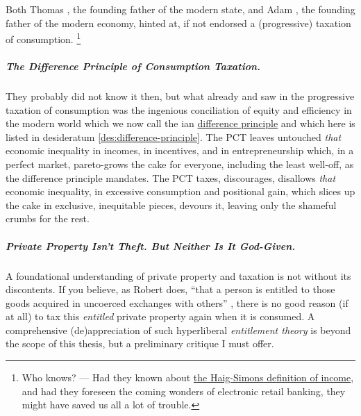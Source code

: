 Both Thomas \citeauthor{Hobbes-1651-aa}, the founding father of the modern state, and Adam \citeauthor{Smith-1776-lq}, the founding father of the modern economy, hinted at, if not endorsed a (progressive) taxation of consumption.
\footnote{
	Who knows?
	--- Had they known about \hyperref[eq:HaigSimonsPCT]{the Haig-Simons definition of income}, and had they foreseen the coming wonders of electronic retail banking, they might have saved us all a lot of trouble.
}

\subparagraph{The Difference Principle of Consumption Taxation.}
They probably did not know it then, but what already \citeauthor{Hobbes-1651-aa} and \citeauthor{Smith-1776-lq} saw in the progressive taxation of consumption was the ingenious conciliation of equity and efficiency in the modern world which we now call the \citeauthor{Rawls-1971}ian \hyperref[des:difference-principle]{difference principle} and which here is listed in desideratum \ref{des:difference-principle}.
The PCT leaves untouched \emph{that} economic inequality in incomes, in incentives, and in entrepreneurship which, in a perfect market, pareto-grows the cake for everyone, including the least well-off, as the difference principle mandates.
The PCT taxes, discourages, disallows \emph{that} economic inequality, in excessive consumption and positional gain, which slices up the cake in exclusive, inequitable pieces, devours it, leaving only the shameful crumbs for the rest.

\subparagraph{Private Property Isn't Theft. But Neither Is It God-Given.}
	\label{sec:AntiEntitlement}
A foundational understanding of private property and taxation is not without its discontents.
If you believe, as Robert \citeauthor{Nozick1974} does, ``that a person is entitled to those goods acquired in uncoerced exchanges with others'' \citeyearpar[149]{Nozick1974}, there is no good reason (if at all) to tax this \emph{entitled} private property again when it is consumed.
A comprehensive (de)appreciation of such hyperliberal \emph{entitlement theory} is beyond the scope of this thesis, but a preliminary critique I must offer.

